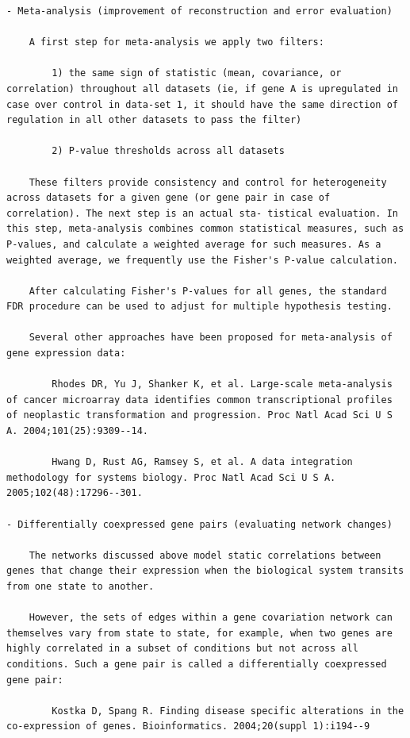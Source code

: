 \documentclass[
]{book}
\begin{document}
\begin{verbatim}
- Meta-analysis (improvement of reconstruction and error evaluation)

    A first step for meta-analysis we apply two filters:

        1) the same sign of statistic (mean, covariance, or correlation) throughout all datasets (ie, if gene A is upregulated in case over control in data-set 1, it should have the same direction of regulation in all other datasets to pass the filter)

        2) P-value thresholds across all datasets

    These filters provide consistency and control for heterogeneity across datasets for a given gene (or gene pair in case of correlation). The next step is an actual sta- tistical evaluation. In this step, meta-analysis combines common statistical measures, such as P-values, and calculate a weighted average for such measures. As a weighted average, we frequently use the Fisher's P-value calculation.

    After calculating Fisher's P-values for all genes, the standard FDR procedure can be used to adjust for multiple hypothesis testing.

    Several other approaches have been proposed for meta-analysis of gene expression data:

        Rhodes DR, Yu J, Shanker K, et al. Large-scale meta-analysis of cancer microarray data identifies common transcriptional profiles of neoplastic transformation and progression. Proc Natl Acad Sci U S A. 2004;101(25):9309--14.

        Hwang D, Rust AG, Ramsey S, et al. A data integration methodology for systems biology. Proc Natl Acad Sci U S A. 2005;102(48):17296--301.

- Differentially coexpressed gene pairs (evaluating network changes)

    The networks discussed above model static correlations between genes that change their expression when the biological system transits from one state to another.

    However, the sets of edges within a gene covariation network can themselves vary from state to state, for example, when two genes are highly correlated in a subset of conditions but not across all conditions. Such a gene pair is called a differentially coexpressed gene pair:

        Kostka D, Spang R. Finding disease specific alterations in the co-expression of genes. Bioinformatics. 2004;20(suppl 1):i194--9




\end{verbatim}
\end{document}
